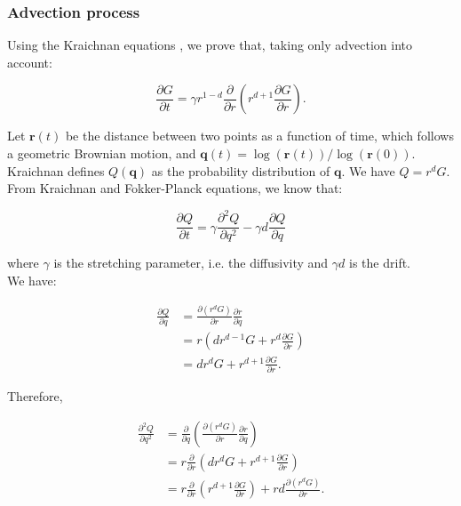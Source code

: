 \subsubsection*{Advection process}

Using the Kraichnan equations \cite{kraichnan_convection_1974}, we prove that, taking only advection into account:

\begin{equation}
\frac{\partial G}{\partial t}=\gamma r^{1-d}\frac{\partial}{\partial r}\left(r^{d+1}\frac{\partial G}{\partial r}\right). \label{eq:eq_2_Young_advection}
\end{equation}

Let $\boldsymbol{r}(t)$ be the distance between two points as a function of time, which follows a geometric Brownian motion, and $\boldsymbol{q}(t)=\log(\boldsymbol{r}(t))/\log(\boldsymbol{r}(0))$.
Kraichnan defines $Q(\boldsymbol{q})$ as the probability distribution of $\boldsymbol{q}$. We have $Q=r^{d}G$. From Kraichnan \cite{kraichnan_convection_1974} and Fokker-Planck equations, we know that:

\begin{equation}
\frac{\partial Q}{\partial t}=\gamma\frac{\partial^{2}Q}{\partial q^{2}}-\gamma d\frac{\partial Q}{\partial q}\label{eq:FokkerPlanck}
\end{equation}

where $\gamma$ is the stretching parameter, i.e. the diffusivity and $\gamma d$ is the drift. \\

We have:

\begin{subequations} 
\begin{align}
\frac{\partial Q}{\partial q} & =\frac{\partial(r^{d}G)}{\partial r}\frac{\partial r}{\partial q}\label{computedGdQ1}\\
 & =r\left(dr^{d-1}G+r^{d}\frac{\partial G}{\partial r}\right)\label{computedGdQ2}\\
 & =dr^{d}G+r^{d+1}\frac{\partial G}{\partial r}.
\end{align}
 \end{subequations}

Therefore,

\begin{subequations}

\begin{align}
\frac{\partial^{2}Q}{\partial q^{2}} & =\frac{\partial}{\partial q}\left(\frac{\partial(r^{d}G)}{\partial r}\frac{\partial r}{\partial q}\right)\label{computedGdQ1-1}\\
 & =r\frac{\partial}{\partial r}\left(dr^{d}G+r^{d+1}\frac{\partial G}{\partial r}\right)\label{computedGdQ2-1}\\
 & =r\frac{\partial}{\partial r}\left(r^{d+1}\frac{\partial G}{\partial r}\right)+rd\frac{\partial(r^{d}G)}{\partial r}.
\end{align}

\end{subequations}

